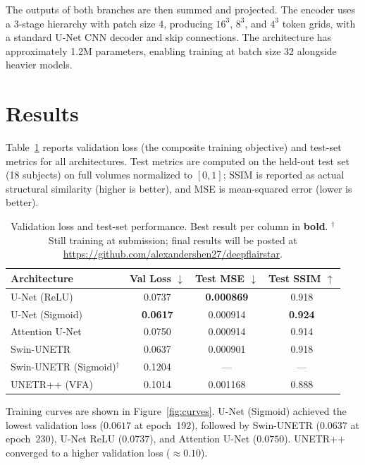\documentclass{article}
\begin{document}
The outputs of both branches are then summed and projected. The encoder uses a
3-stage hierarchy with patch size 4, producing $16^3$, $8^3$, and $4^3$ token
grids, with a standard U-Net CNN decoder and skip connections. The architecture
has approximately 1.2M parameters, enabling training at batch size 32 alongside
heavier models.

\section{Results}

Table~\ref{tab:results} reports validation loss (the composite training
objective) and test-set metrics for all architectures. Test metrics are
computed on the held-out test set (18 subjects) on full volumes normalized
to $[0,1]$; SSIM is reported as actual structural similarity (higher is
better), and MSE is mean-squared error (lower is better).

\begin{table}[h]
  \caption{Validation loss and test-set performance. Best result per column in
           \textbf{bold}. $^\dagger$Still training at submission; final results
           will be posted at \url{https://github.com/alexandershen27/deepflairstar}.}
  \label{tab:results}
  \centering
  \begin{tabular}{lccc}
    \toprule
    Architecture    & Val Loss $\downarrow$ & Test MSE $\downarrow$ & Test SSIM $\uparrow$ \\
    \midrule
    U-Net (ReLU)    & 0.0737          & \textbf{0.000869} & 0.918          \\
    U-Net (Sigmoid) & \textbf{0.0617} & 0.000914          & \textbf{0.924} \\
    Attention U-Net & 0.0750          & 0.000914          & 0.914          \\
    Swin-UNETR      & 0.0637          & 0.000901          & 0.918          \\
    Swin-UNETR (Sigmoid)$^\dagger$ & 0.1204 & — & — \\
    UNETR++ (VFA)   & 0.1014          & 0.001168          & 0.888          \\
    \bottomrule
  \end{tabular}
\end{table}

Training curves are shown in Figure~\ref{fig:curves}. U-Net (Sigmoid)
achieved the lowest validation loss ($0.0617$ at epoch~192), followed by
Swin-UNETR ($0.0637$ at epoch~230), U-Net ReLU ($0.0737$), and Attention
U-Net ($0.0750$). UNETR++ converged to a higher validation loss
(${\approx}0.10$).
\end{document}
